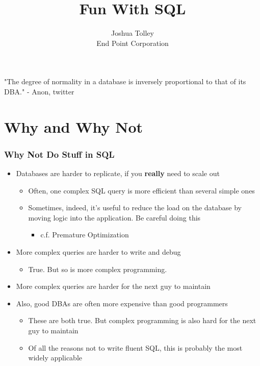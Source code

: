 \documentclass{beamer}
\begin{document}
\title{Fun With SQL}
\author{Joshua Tolley\\
    End Point Corporation
}

\frame{\titlepage}

\begin{frame}
"The degree of normality in a database is inversely proportional to that of its DBA."
- Anon, twitter
\end{frame}

\section{Why and Why Not}
\begin{frame}
    \frametitle{Why Not Do Stuff in SQL}
    \begin{itemize}
        \item Databases are harder to replicate, if you \textbf{really} need to scale out
        \begin{itemize}
            \item Often, one complex SQL query is more efficient than several simple ones
            \item Sometimes, indeed, it's useful to reduce the load on the database by moving logic into the application. Be careful doing this
            \begin{itemize}
                \item c.f. Premature Optimization
            \end{itemize}
        \end{itemize}
        \item More complex queries are harder to write and debug
        \begin{itemize}
            \item True. But so is more complex programming.
        \end{itemize}
        \item More complex queries are harder for the next guy to maintain
        \item Also, good DBAs are often more expensive than good programmers
        \begin{itemize}
            \item These are both true. But complex programming is also hard for the next guy to maintain
            \item Of all the reasons not to write fluent SQL, this is probably the most widely applicable
        \end{itemize}
    \end{itemize}
\end{frame}
\end{document}
